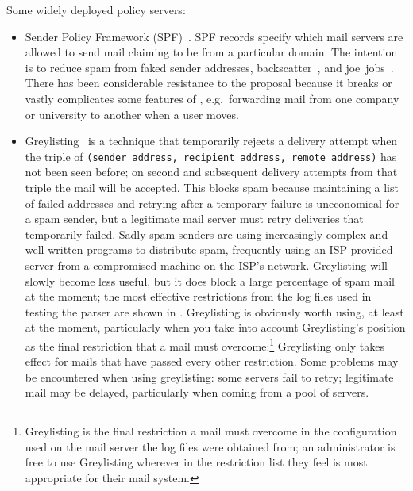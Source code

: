 Some widely deployed policy servers:

\begin{itemize}

    \item Sender Policy Framework (SPF)~\cite{openspf}.  SPF\label{spf
        introduction} records specify which mail servers are allowed to
        send mail claiming to be from a particular domain.  The intention
        is to reduce spam from faked sender addresses,
        backscatter~\cite{postfix-backscatter}, and
        joe~jobs~\cite{Wikipedia-joe-job}.  There has been
        considerable resistance to the proposal because it breaks or vastly
        complicates some features of , e.g.\ forwarding mail
        from one company or university to another when a user moves.

    \item Greylisting~\cite{greylisting} is a technique that temporarily
        rejects a delivery attempt when the triple of \newline{}
        \tab{}\texttt{(sender address, recipient address, remote
         address)}\newline{} has not been seen before; on
        second and subsequent delivery attempts from that triple the mail
        will be accepted.  This blocks spam because maintaining a list of
        failed addresses and retrying after a temporary failure is
        uneconomical for a spam sender, but a legitimate mail server must
        retry deliveries that temporarily failed.  Sadly spam senders are
        using increasingly complex and well written programs to distribute
        spam, frequently using an ISP provided  server from a
        compromised machine on the ISP's network.  Greylisting will slowly
        become less useful, but it does block a large percentage of spam
        mail at the moment; the most effective restrictions from the
        \numberOFlogFILES{} log files used in testing the parser are shown
        in .  Greylisting is obviously
        worth using, at least at the moment, particularly when you take
        into account Greylisting's position as the final restriction that a
        mail must overcome:\footnote{Greylisting is the final restriction a
        mail must overcome in the configuration used on the mail server the
        log files were obtained from; an administrator is free to use
        Greylisting wherever in the restriction list they feel is most
        appropriate for their mail system.} Greylisting only takes effect
        for mails that have passed every other restriction.  Some problems
        may be encountered when using greylisting: some servers fail to
        retry; legitimate mail may be delayed, particularly when coming
        from a pool of servers.


\end{itemize}

